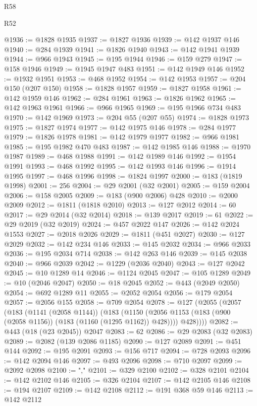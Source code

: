 \begin{lexlean}{R58}
\begin{lexlean}{R52}
\begin{coremodule}
{{{{{{{{{{{{{{{{{{{{{{{{{{{{{{{{{{{{{{{{{{{{{{{{{{{{{{{{{{{{{{{{{{{{{{{{{{{{{{{{{{{{{{{{{{{{{{{{{{{{{{{{{{{{{{{{{{{{{{{{{{{{{{{{{{{{{{{{{{{{{{{{{{{{{{{{{{{{{{{{{{{{{{{{{{{{{{{{{{{{{{{{{{{{{{{{{{{{{{@1936 := @1828 @1935
@1937 := @1827 @1936
@1939 := @142 @1937 @146
@1940 := @284 @1939
@1941 := @1826 @1940
@1943 := @142 @1941 @1939
@1944 := @966 @1943
@1945 := @195 @1944
@1946 := @159 @279
@1947 := @158 @1946
@1949 := @1945 @1947 @483
@1951 := @142 @1949 @146
@1952 := @1932 @1951
@1953 := @468 @1952
@1954 := @142 @1953
@1957 := @204 @150 (@207 @150)
@1958 := @1828 @1957
@1959 := @1827 @1958
@1961 := @142 @1959 @146
@1962 := @284 @1961
@1963 := @1826 @1962
@1965 := @142 @1963 @1961
@1966 := @966 @1965
@1969 := @195 @1966 @734 @483
@1970 := @142 @1969
@1973 := @204 @55 (@207 @55)
@1974 := @1828 @1973
@1975 := @1827 @1974
@1977 := @142 @1975 @146
@1978 := @284 @1977
@1979 := @1826 @1978
@1981 := @142 @1979 @1977
@1982 := @966 @1981
@1985 := @195 @1982 @470 @483
@1987 := @142 @1985 @146
@1988 := @1970 @1987
@1989 := @468 @1988
@1991 := @142 @1989 @146
@1992 := @1954 @1991
@1993 := @468 @1992
@1995 := @142 @1993 @146
@1996 := @1914 @1995
@1997 := @468 @1996
@1998 := @1824 @1997
@2000 := @183 (@1819 @1998)
@2001 := 256
@2004 := @29 @2001 (@32 @2001)
@2005 := @159 @2004
@2006 := @158 @2005
@2009 := @183 (@900 @2006) @428
@2010 := @2000 @2009
@2012 := @1811 (@1818 @2010)
@2013 := @127 @2012
@2014 := 60
@2017 := @29 @2014 (@32 @2014)
@2018 := @139 @2017
@2019 := 61
@2022 := @29 @2019 (@32 @2019)
@2024 := @457 @2022 @147
@2026 := @142 @2024 @1553
@2027 := @2018 @2026
@2029 := @1811 (@451 @2027)
@2030 := @127 @2029
@2032 := @142 @234 @146
@2033 := @145 @2032
@2034 := @966 @2033
@2036 := @195 @2034 @714
@2038 := @142 @263 @146
@2039 := @145 @2038
@2040 := @966 @2039
@2042 := @1229 (@2036 @2040)
@2043 := @127 @2042
@2045 := @10 @1289 @14
@2046 := @1124 @2045
@2047 := @105 @1289
@2049 := @10 (@2046 @2047)
@2050 := @18 @2045
@2052 := @443 (@2049 @2050)
@2054 := @692 @1289 @11
@2055 := @2052 @2054
@2056 := @179 @2054
@2057 := @2056 @155
@2058 := @709 @2054
@2078 := @127
    (@2055
      (@2057
        (@183
          (@1141 (@2058 @1144))
          (@183
            (@1150 (@2056 @1153 (@183 (@900 (@2058 @1156)) (@183 (@1160 (@1295 @1162)) @428))))
            @428))))
@2082 := @443 (@18 (@23 @2045)) @2047
@2083 := 62
@2086 := @29 @2083 (@32 @2083)
@2089 := @2082 (@139 @2086 @1185)
@2090 := @127 @2089
@2091 := @451 @144
@2092 := @195 @2091
@2093 := @156 @717
@2094 := @728 @2093
@2096 := @142 @2094 @146
@2097 := @493 @2096
@2098 := @710 @2097
@2099 := @2092 @2098
@2100 := ","
@2101 := @329 @2100
@2102 := @328 @2101
@2104 := @142 @2102 @146
@2105 := @326 @2104
@2107 := @142 @2105 @146
@2108 := @194 @2107
@2109 := @142 @2108
@2112 := @191 @368 @59 @146
@2113 := @142 @2112
}}}}}}}}}}}}}}}}}}}}}}}}}}}}}}}}}}}}}}}}}}}}}}}}}}}}}}}}}}}}}}}}}}}}}}}}}}}}}}}}}}}}}}}}}}}}}}}}}}}}}}}}}}}}}}}}}}}}}}}}}}}}}}}}}}}}}}}}}}}}}}}}}}}}}}}}}}}}}}}}}}}}}}}}}}}}}}}}}}}}}}}}}}}}}}}}}}}}}}
\end{coremodule}
\end{lexlean}
\end{lexlean}

